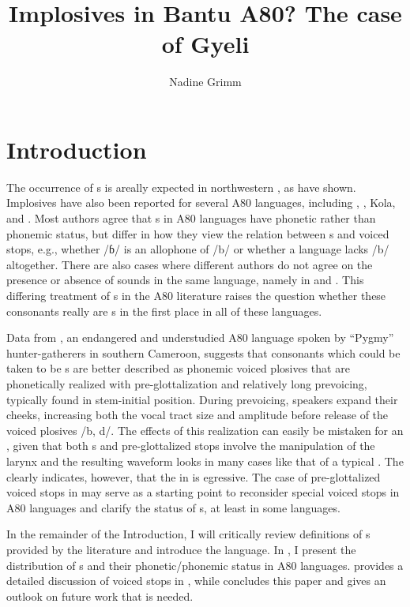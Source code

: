 \documentclass[output=paper,modfonts,nonflat,
\ChapterDOI{10.5281/zenodo.3367134}
 hidelinks
]{langsci/langscibook}
\author{Nadine Grimm\affiliation{University of Rochester}}
\title{Implosives in Bantu A80? The case of Gyeli}
\begin{document}
\maketitle


\section{Introduction} 
\label{sec:grimm:1}

 The occurrence of s is areally expected in northwestern , as  \citet[58]{Clements2008} have shown. Implosives have also been reported for several  A80 languages, including , , Kola, and . Most authors agree that s in A80 languages have phonetic rather than phonemic status, but differ in how they view the relation between s and voiced stops, e.g., whether /ɓ/ is an allophone of /b/ or whether a language lacks /b/ altogether. There are also cases where different authors do not agree on the presence or absence of  sounds in the same language, namely in  and . This differing treatment of s in the A80 literature raises the question whether these consonants really are s in the first place in all of these languages.

Data from , an endangered and understudied  A80 language spoken by ``Pygmy'' hunter-gatherers in southern Cameroon, suggests that consonants which could be taken to be s are better described as phonemic voiced plosives that are phonetically realized with pre-glottalization and relatively long prevoicing, typically found in stem-initial position. During prevoicing, speakers expand their cheeks, increasing both the vocal tract size and amplitude before release of the voiced plosives /b, d/.   The effects of this realization can easily be mistaken for an , given that both s and pre-glottalized stops involve the manipulation of the larynx and the resulting waveform looks in many cases like that of a typical . The  clearly indicates, however, that the  in  is egressive. The case of pre-glottalized voiced stops in  may serve as a starting point to reconsider special voiced stops in A80 languages and clarify the status of s, at least in some languages.

In the remainder of the Introduction, I will critically review definitions of s provided by the literature and introduce the  language. In , I present the distribution of s and their phonetic/phonemic status in  A80 languages.  provides a detailed discussion of voiced stops in , while  concludes this paper and gives an outlook on future work that is needed.
\end{document}
